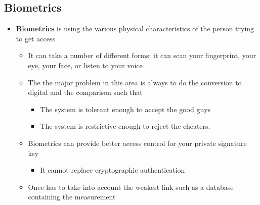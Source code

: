 \documentclass[11pt]{article}
\begin{document}
\subsection{Biometrics}
\label{sec:orgf9e9fbe}
\begin{itemize}
\item \textbf{Biometrics} is using the various physical characteristics of the person trying to get access
\begin{itemize}
\item It can take a number of different forms: it can scan your fingerprint, your eye, your face, or listen to your voice
\item The the major problem in this area is always to do the conversion to digital and the comparison such that 
\begin{itemize}
\item The system is tolerant enough to accept the good guys
\item The system is restrictive enough to reject the cheaters.
\end{itemize}
\item Biometrics can provide better access control for your private signature key
\begin{itemize}
\item It cannot replace cryptographic authentication
\end{itemize}
\item Once has to take into account the weakest link such as a database containing the measurement
\end{itemize}
\end{itemize}
\end{document}
